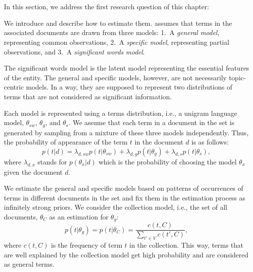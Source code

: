 \section{\SWLMs}
\label{sec:swlm}
In this section, we address the first research question of this chapter: 

We introduce \SWLMs and describe how to estimate them. \acswlm assumes that terms in the associated documents are drawn from three models: 1.~A \emph{general model}, representing common observations, 2.~A \emph{specific model}, representing partial observations, and 3.~A \emph{significant words model}. 

The significant words model is the latent model representing the essential features of the entity. The general and specific models, however, are not necessarily topic-centric models. In a way, they are supposed to represent two distributions of terms that are not considered as significant information. 

Each model is represented using a terms distribution, i.e., a unigram language model, $\theta_{sw}$, $\theta_g$, and $\theta_s$. 
We assume that each term in a document in the set is generated by sampling from a mixture of these three models independently. Thus, the probability of appearance of the term $t$ in the document $d$ is as follows:
\begin{equation}
p(t|d) =  \lambda_{d,sw} p(t|\theta_{sw}) + \lambda_{d,g} p(t|\theta_g) + \lambda_{d,s} p(t|\theta_s),
\end{equation}
where $\lambda_{d,x}$ stands for $p(\theta_x|d)$ which is the probability of choosing the model $\theta_x$ given the document $d$. 

We estimate the general and specific models based on patterns of occurrences of terms in different documents in the set and fix them in the estimation process as infinitely strong priors. 
We consider the collection model, i.e., the set of all documents, $\theta_C$ as an estimation for $\theta_g$:
\begin{equation}
p(t|\theta_g) = 
p(t|\theta_C) = \frac{c(t,C)}{\sum_{t' \in V} c(t',C)},
\end{equation} 
where $c(t,C)$ is the frequency of term $t$ in the collection. This way, terms that are well explained by the collection model get high probability and are considered as general terms.

